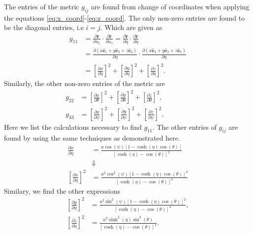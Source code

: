 \documentclass[main.tex]{subfiles}
\begin{document}
The entries of the metric $g_{ij}$ are found from change of coordinates when applying the 
equations \eqref{eq:x_coord}-\eqref{eq:z_coord}. The only non-zero entries are found to be 
the diagonal entries, i.e $i=j$. Which are given as
\begin{align*}
g_{11} &= \frac{\partial \mathbf{r}}{\partial u_1} \cdot \frac{\partial \mathbf{r}}{\partial u_1} 
	    = \frac{\partial \mathbf{r}}{\partial \eta} \cdot \frac{\partial \mathbf{r}}{\partial \eta} \\
 	 & =  \frac{\partial (x\hat{\mathbf{e}}_1 + y\hat{\mathbf{e}}_2 + 
		z\hat{\mathbf{e}}_3)}{\partial \eta} \cdot \frac{\partial (x\hat{\mathbf{e}}_1 +
	         y\hat{\mathbf{e}}_2 + z\hat{\mathbf{e}}_3)}{\partial \eta} \\
	 & = \left[\frac{\partial x}{\partial \eta} \right]^2 + \left[\frac{\partial y}{\partial \eta} \right]^2
		+ \left[\frac{\partial z}{\partial \eta} \right]^2.
\end{align*}
Similarly, the other non-zero entries of the metric are 
\begin{align*}
g_{22} &= \left[\frac{\partial x}{\partial \theta} \right]^2 + \left[\frac{\partial y}{\partial \theta} \right]^2
	    + \left[\frac{\partial z}{\partial \theta} \right]^2, \qquad\qquad\\
g_{33} &= \left[\frac{\partial x}{\partial \psi} \right]^2 + \left[\frac{\partial y}{\partial \psi} \right]^2
	    + \left[\frac{\partial z}{\partial \psi} \right]^2.
\end{align*}
Here we list the calculations necessary to find $g_{11}$. The other entries of $g_{ij}$ are found by
using the same techniques as demonstrated here.
\begin{align*}
\frac{\partial x}{\partial \eta} &= \frac{a \cos(\psi) [1 - \cosh(\eta)\cos(\theta)]}
						    {[\cosh(\eta) - \cos(\theta)]^2} \\
&\Downarrow \\
\left[\frac{\partial x}{\partial \eta} \right]^2 &= \frac{a^2 \cos^2(\psi) [1 - \cosh(\eta)\cos(\theta)]^2}
								    {[\cosh(\eta) - \cos(\theta)]^4}
\end{align*}
Similary, we find the other expressions
\begin{align*}
\left[\frac{\partial y}{\partial \eta} \right]^2 &= \frac{a^2 \sin^2(\psi) [1 - \cosh(\eta)\cos(\theta)]^2}
								    {[\cosh(\eta) - \cos(\theta)]^4}, \\
\left[\frac{\partial z}{\partial \eta} \right]^2 &= \frac{a^2\sinh^2(\eta)\sin^2(\theta)}
								    {[\cosh(\eta) - \cos(\theta)]^4}.
\end{align*}
\end{document}
